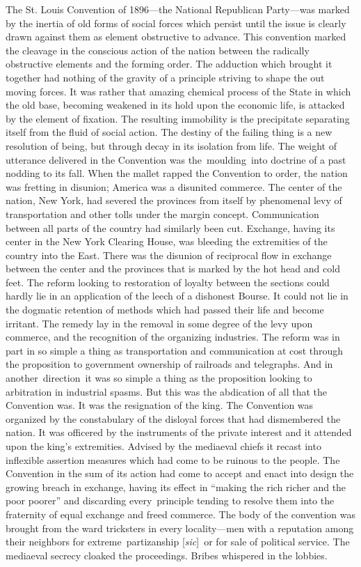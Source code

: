 \documentclass[openany,nobib]{tufte-book}
\begin{document}
The St. Louis Convention of 1896---the National Republican Party---was
marked by the inertia of old forms of social forces which persist until
the issue is clearly drawn against them as element obstructive to
advance. This convention marked the cleavage in the conscious action of
the nation between the radically obstructive elements and the forming
order. The adduction which brought it together had nothing of the
gravity of a principle striving to shape the out moving forces. It was
rather that amazing chemical process of the State in which the old base,
becoming weakened in its hold upon the economic life, is attacked by the
element of fixation. The resulting immobility is the precipitate
separating itself from the fluid of social action. The destiny of the
failing thing is a new resolution of being, but through decay in its
isolation from life. The weight of utterance delivered in the Convention
was the~moulding~into doctrine of a past nodding to its fall. When the
mallet rapped the Convention to order, the nation was fretting in
disunion; America was a disunited commerce. The center of the nation,
New York, had severed the provinces from itself by phenomenal levy of
transportation and other tolls under the margin concept. Communication
between all parts of the country had similarly been cut. Exchange,
having its center in the New York Clearing House, was bleeding the
extremities of the country into the East. There was the disunion of
reciprocal flow in exchange between the center and the provinces that is
marked by the hot head and cold feet. The reform looking to restoration
of loyalty between the sections could hardly lie in an application of
the leech of a dishonest Bourse. It could not lie in the dogmatic
retention of methods which had passed their life and become irritant.
The remedy lay in the removal in some degree of the levy upon commerce,
and the recognition of the organizing industries. The reform was in part
in so simple a thing as transportation and communication at cost through
the proposition to government ownership of railroads and telegraphs. And
in another~direction~it was so simple a thing as the proposition looking
to arbitration in industrial spasms. But this was the abdication of all
that the Convention was. It was the resignation of the king. The
Convention was organized by the constabulary of the disloyal forces that
had dismembered the nation. It was officered by the instruments of the
private interest and it attended upon the king's extremities. Advised by
the mediaeval chiefs it recast into inflexible assertion measures which
had come to be ruinous to the people. The Convention in the sum of its
action had come to accept and enact into design the growing breach in
exchange, having its effect in ``making the rich richer and the poor
poorer'' and discarding every~principle tending to resolve them into the
fraternity of equal exchange and freed commerce. The body of the
convention was brought from the ward tricksters in every locality---men
with a reputation among their neighbors for extreme~partizanship
{[}\emph{sic}{]}~or for sale of political service. The mediaeval secrecy
cloaked the proceedings. Bribes whispered in the lobbies.~
\end{document}
